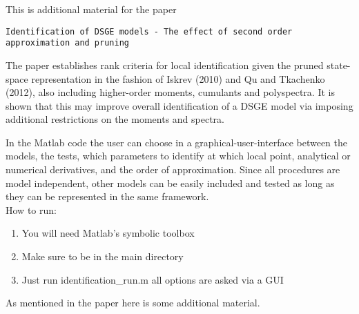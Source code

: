 \documentclass{article}
\begin{document}
This is additional material for the paper \begin{center}
\texttt{Identification of DSGE models - The effect of second order approximation and pruning}\end{center} The paper establishes rank criteria for local identification given the pruned state-space representation in the fashion of Iskrev (2010) and Qu and Tkachenko (2012), also including higher-order moments, cumulants and polyspectra. It is shown that this may improve overall identification of a DSGE model via imposing additional restrictions on the moments and spectra.

In the Matlab code the user can choose in a graphical-user-interface between the models, the tests, which parameters to
identify at which local point, analytical or numerical derivatives, and the order of approximation.
Since all procedures are model independent, other models can be easily
included and tested as long as they can be represented in the same framework.\\
How to run:
\begin{enumerate}
\item You will need Matlab's symbolic toolbox
\item Make sure to be in the main directory
\item Just run identification\_run.m all options are asked via a GUI
\end{enumerate}

As mentioned in the paper here is some additional material.
\end{document}
